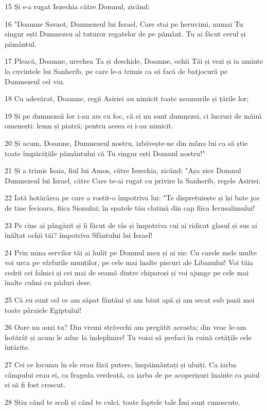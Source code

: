 \par 15 Și s-a rugat Iezechia către Domnul, zicând:
\par 16 "Doamne Savaot, Dumnezeul lui Israel, Care stai pe heruvimi, numai Tu singur ești Dumnezeu al tuturor regatelor de pe pământ. Tu ai făcut cerul și pământul.
\par 17 Pleacă, Doamne, urechea Ta și deschide, Doamne, ochii Tăi și vezi și ia aminte la cuvintele lui Sanherib, pe care le-a trimis ca să facă de batjocură pe Dumnezeul cel viu.
\par 18 Cu adevărat, Doamne, regii Asiriei au nimicit toate neamurile și țările lor;
\par 19 Și pe dumnezeii lor i-au ars cu foc, că ei nu sunt dumnezei, ci lucruri de mâini omenești: lemn și piatră; pentru aceea ei i-au nimicit.
\par 20 Și acum, Doamne, Dumnezeul nostru, izbăvește-ne din mâna lui ca să știe toate împărățiile pământului că Tu singur ești Domnul nostru!"
\par 21 Și a trimis Isaia, fiul lui Amos, către Iezechia, zicând: "Așa zice Domnul Dumnezeul lui Israel, către Care te-ai rugat cu privire la Sanherib, regele Asiriei;
\par 22 Iată hotărârea pe care a rostit-o împotriva lui: "Te disprețuiește și își bate joc de tine fecioara, fiica Sionului; în spatele tău clatină din cap fiica Ierusalimului!
\par 23 Pe cine ai pângărit și îi făcut de râs și împotriva cui ai ridicat glasul și sus ai înălțat ochii tăi? împotriva Sfântului lui Israel!
\par 24 Prin mina servilor tăi ai hulit pe Domnul meu și ai zis: Cu carele mele multe voi urca pe vârfurile munților, pe cele mai înalte piscuri ale Libanului! Voi tăia cedrii cei falnici și cei mai de seamă dintre chiparoși și voi ajunge pe cele mai înalte culmi cu păduri dese.
\par 25 Că eu sunt cel ce am săpat fântâni și am băut apă și am secat sub pașii mei toate pâraiele Egiptului!
\par 26 Oare nu auzi tu? Din vremi străvechi am pregătit aceasta; din veac le-am hotărât și acum le aduc la îndeplinire! Tu voiai să prefaci în ruină cetățile cele întărite.
\par 27 Cei ce locuiau în ele erau fără putere, înspăimântați și uluiți. Ca iarba câmpului erau ei, ca frageda verdeață, ca iarba de pe acoperișuri înainte ca paiul ei să fi fost crescut.
\par 28 Știu când te scoli și când te culci, toate faptele tale Îmi sunt cunoscute.
